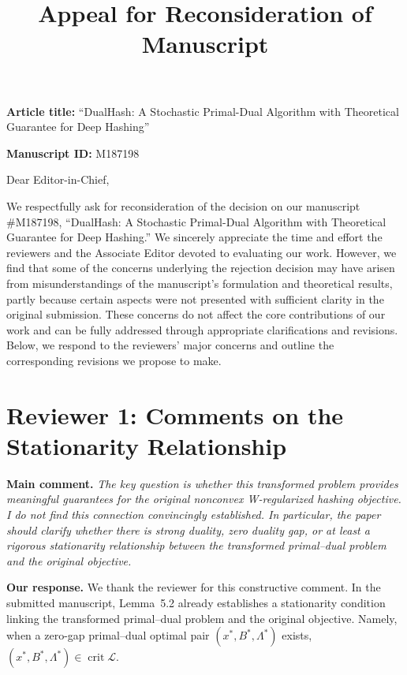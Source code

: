 \documentclass[11pt]{article}
\title{Appeal for Reconsideration of Manuscript}
\author{}
\date{}
\begin{document}
\maketitle

\vspace{0.5em}
\noindent\textbf{Article title:} ``DualHash: A Stochastic Primal-Dual Algorithm with Theoretical Guarantee for Deep Hashing''

\vspace{0.5em}
\noindent\textbf{Manuscript ID:} M187198

\vspace{0.5em}
\noindent Dear Editor-in-Chief,

We respectfully ask for reconsideration of the decision on our manuscript
\#M187198, ``DualHash: A Stochastic Primal-Dual Algorithm with Theoretical
Guarantee for Deep Hashing.'' We sincerely appreciate the time and effort the reviewers and the Associate Editor devoted to evaluating our work. However, we find that some of the concerns underlying the rejection decision may have arisen from misunderstandings of the manuscript’s formulation and theoretical results, partly because certain aspects were not presented with sufficient clarity in the original submission. These concerns do not affect the core contributions of our work and can be fully addressed through appropriate clarifications and revisions. Below, we respond to the reviewers’ major concerns and outline the corresponding revisions we propose to make. 


\section{Reviewer 1: Comments on the Stationarity Relationship}

\vspace{0.5em}
\noindent\textbf{Main comment.} \emph{%
The key question is whether this transformed problem provides meaningful guarantees for the original nonconvex W-regularized hashing objective. I do not find this connection convincingly established. In particular, the paper should clarify whether there is strong duality, zero duality gap, or at least a rigorous stationarity relationship between the transformed primal--dual problem and the original objective.}

\vspace{0.5em}
\noindent\textbullet\quad\textbf{{Our response.} }
We thank the reviewer for this constructive comment. In the submitted manuscript, Lemma~5.2 already establishes a stationarity condition linking the transformed primal--dual problem and the original objective. 
Namely, when a zero-gap primal--dual optimal pair $(x^*,B^*,\Lambda^*)$
exists, $(x^*,B^*,\Lambda^*)\in\operatorname{crit}\mathcal{L}$. 
\end{document}
